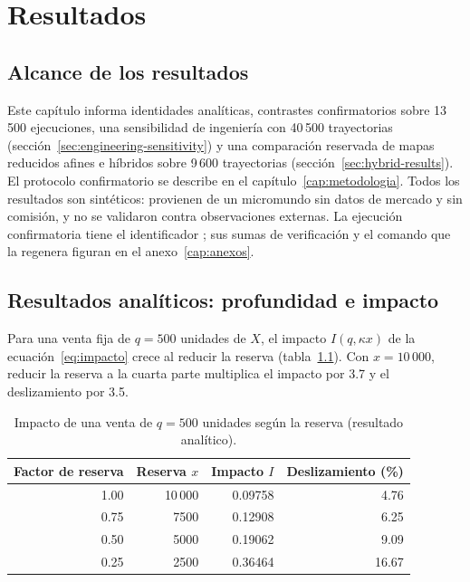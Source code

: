 \chapter{Resultados}
\label{cap:resultados}

\section{Alcance de los resultados}

Este capítulo informa identidades analíticas, contrastes confirmatorios sobre 13\,500 ejecuciones, una sensibilidad de ingeniería con 40\,500 trayectorias (sección~\ref{sec:engineering-sensitivity}) y una comparación reservada de mapas reducidos afines e híbridos sobre 9\,600 trayectorias (sección~\ref{sec:hybrid-results}). El protocolo confirmatorio se describe en el capítulo~\ref{cap:metodologia}. Todos los resultados son sintéticos: provienen de un micromundo sin datos de mercado y sin comisión, y no se validaron contra observaciones externas. La ejecución confirmatoria tiene el identificador \code{\RunID}; sus sumas de verificación y el comando que la regenera figuran en el anexo~\ref{cap:anexos}.

\section{Resultados analíticos: profundidad e impacto}
\label{sec:res-analitico}

Para una venta fija de $q=500$ unidades de $X$, el impacto $I(q,\kappa x)$ de la ecuación~\eqref{eq:impacto} crece al reducir la reserva (tabla~\ref{tab:impacto}). Con $x=10\,000$, reducir la reserva a la cuarta parte multiplica el impacto por 3.7 y el deslizamiento por 3.5.

\begin{table}[htbp]
\centering
\caption{Impacto de una venta de $q=500$ unidades según la reserva (resultado analítico).}
\label{tab:impacto}
\small
\begin{tabular}{@{}rrrr@{}}
\toprule
Factor de reserva & Reserva $x$ & Impacto $I$ & Deslizamiento (\%) \\
\midrule
1.00 & 10\,000 & 0.09758 & 4.76 \\
0.75 & 7500 & 0.12908 & 6.25 \\
0.50 & 5000 & 0.19062 & 9.09 \\
0.25 & 2500 & 0.36464 & 16.67 \\
\bottomrule
\end{tabular}
\end{table}

